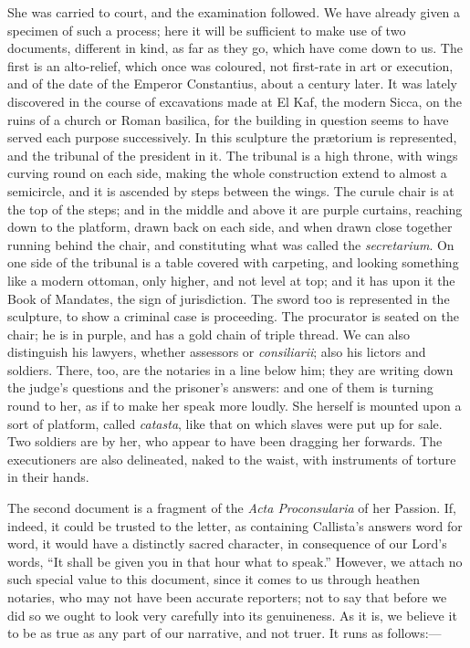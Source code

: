 She was carried to court, and the examination followed. We have
already given a specimen of such a process; here it will be sufficient
to make use of two documents, different in kind, as far as they go,
which have come down to us. The first is an alto-relief, which
once was coloured, not first-rate in art or execution, and of the date
of the Emperor Constantius, about a century later. It was lately
discovered in the course of excavations made at El Kaf, the modern
Sicca, on the ruins of a church or Roman basilica, for the building in
question seems to have served each purpose successively. In this
sculpture the prætorium is represented, and the tribunal of the
president in it. The tribunal is a high throne, with wings curving
round on each side, making the whole construction extend to almost a
semicircle, and it is ascended by steps between the wings. The curule
chair is at the top of the steps; and in the middle and above it are
purple curtains, reaching down to the platform, drawn back on each
side, and when drawn close together running behind the chair, and
constituting what was called the \emph{secretarium}. On one side of
the tribunal is a table covered with carpeting, and looking something
like a modern ottoman, only higher, and not level at top; and it has
upon it the Book of Mandates, the sign of jurisdiction. The sword too
is represented in the sculpture, to show a criminal case is
proceeding. The procurator is seated on the chair; he is in purple,
and has a gold chain of triple thread. We can also distinguish his
lawyers, whether assessors or \emph{consiliarii}; also his lictors and
soldiers. There, too, are the notaries in a line below him; they are
writing down the judge's questions and the prisoner's answers: and one
of them is turning round to her, as if to make her speak more loudly.
She herself is mounted upon a sort of platform, called \emph{catasta},
like that on which slaves were put up for sale. Two soldiers are by
her, who appear to have been dragging her forwards. The executioners
are also delineated, naked to the waist, with instruments of torture
in their hands.

The second document is a fragment of the \emph{Acta Proconsularia}
of her Passion. If, indeed, it could be trusted to the letter, as
containing Callista's answers word for word, it would have a
distinctly sacred character, in consequence of our Lord's words,
``It shall be given you in that hour what to speak.'' However,
we attach no such special value to this document, since it comes to us
through heathen notaries, who may not have been accurate reporters;
not to say that before we did so we ought to look very carefully into
its genuineness. As it is, we believe it to be as true as any part of
our narrative, and not truer. It runs as follows:—

